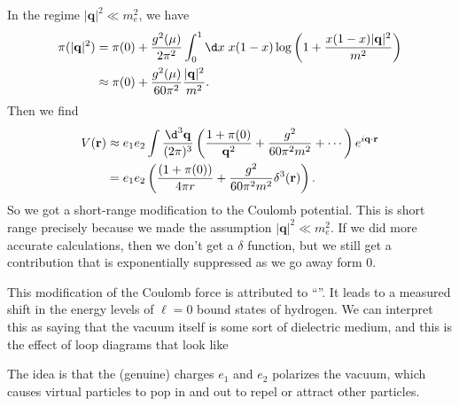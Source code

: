 \documentclass[a4paper]{article}
\begin{document}
In the regime $|\mathbf{q}|^2 \ll m_e^2$, we have
\begin{align*}
  \pi(|\mathbf{q}|^2) &= \pi(0) + \frac{g^2(\mu)}{2\pi^2} \int_0^1 \d x\; x(1 - x) \log \left(1 + \frac{x(1 - x)|\mathbf{q}|^2}{m^2}\right)\\
  &\approx \pi(0) + \frac{g^2(\mu)}{60\pi^2} \frac{|\mathbf{q}|^2}{m^2}.
\end{align*}
Then we find
\begin{align*}
  V(\mathbf{r}) &\approx e_1 e_2 \int \frac{\d^3 \mathbf{q}}{(2\pi)^3} \left(\frac{1 + \pi(0)}{\mathbf{q}^2} + \frac{g^2}{60 \pi^2 m^2} + \cdots\right) e^{i\mathbf{q}\cdot \mathbf{r}}\\
  &= e_1 e_2\left(\frac{ (1 + \pi(0))}{4\pi r} + \frac{g^2}{60 \pi^2 m^2} \delta^3(\mathbf{r})\right).
\end{align*}
So we got a short-range modification to the Coulomb potential. This is short range precisely because we made the assumption $|\mathbf{q}|^2 \ll m_e^2$. If we did more accurate calculations, then we don't get a $\delta$ function, but we still get a contribution that is exponentially suppressed as we go away form $0$.

This modification of the Coulomb force is attributed to ``''. It leads to a measured shift in the energy levels of $\ell = 0$ bound states of hydrogen. We can interpret this as saying that the vacuum itself is some sort of dielectric medium, and this is the effect of loop diagrams that look like
\begin{center}
\end{center}
The idea is that the (genuine) charges $e_1$ and $e_2$ polarizes the vacuum, which causes virtual particles to pop in and out to repel or attract other particles.
\end{document}
